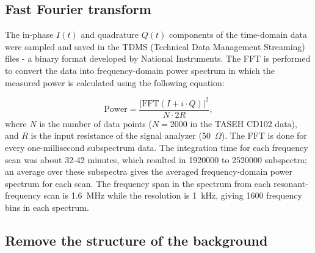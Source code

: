 
\subsection{Fast Fourier transform}
\label{sec:FFT}
The in-phase $I(t)$ and quadrature $Q(t)$ components of the time-domain 
data were sampled and saved in the TDMS 
(Technical Data Management Streaming) files - a 
binary format developed by National Instruments.
The FFT is performed to convert the data into 
frequency-domain power spectrum in which the measured power is calculated 
using the following equation:

\begin{equation}
\label{eq:4.1}
    \text{Power} = \frac{|\text{FFT}(I+i \cdot Q)|^{2}}{N \cdot 2R},
\end{equation}
where $N$ is the number of data points ($N  = 2000$ in the TASEH 
CD102 data), and $R$ is the input resistance of the signal analyzer 
(50~$\Omega$).
The FFT is done for every one-millisecond subspectrum data. The integration 
time for each frequency scan was about 32-42 minutes, which resulted 
in 1920000 to 2520000 subspectra; an average over these subspectra gives 
the averaged frequency-domain power spectrum for each scan. 
The frequency span in the spectrum from each resonant-frequency scan is 
1.6~MHz while the 
resolution is 1~kHz, giving 1600 frequency bins in each spectrum.  

\subsection{Remove the structure of the background}

